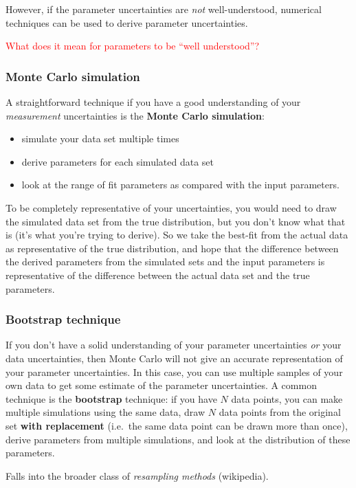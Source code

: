 \documentclass{article}
\newcommand{\mynotes}[1]{%
    \textcolor{myGreen}{#1}
    }
\begin{document}
However, if the parameter uncertainties are \emph{not} well-understood,
numerical techniques can be used to derive parameter uncertainties.

\textcolor{red}{What does it mean for parameters to be ``well understood''?}

\subsubsection{Monte Carlo simulation}
A straightforward technique if you have a good understanding of your
\emph{measurement} uncertainties is the \textbf{Monte Carlo simulation}:
\begin{itemize}
    \item simulate your data set multiple times
    \item derive parameters for each simulated data set
    \item look at the range of fit parameters as compared with
        the input parameters.
\end{itemize}
To be completely representative of your uncertainties, you would need to draw
the simulated data set from the true distribution, but you don't know what that
is (it's what you're trying to derive). So we take the best-fit from the actual
data as representative of the true distribution, and hope that the difference
between the derived parameters from the simulated sets and the input parameters
is representative of the difference between the actual data set and the true
parameters.

\subsubsection{Bootstrap technique}
If you don't have a solid understanding of your parameter uncertainties
\emph{or} your data uncertainties, then Monte Carlo will not give an accurate
representation of your parameter uncertainties. In this case, you can use
multiple samples of your own data to get some estimate of the parameter
uncertainties. A common technique is the \textbf{bootstrap} technique: if you
have $N$ data points, you can make multiple simulations using the same data,
draw $N$ data points from the original set \textbf{with replacement} (i.e.\ the
same data point can be drawn more than once), derive parameters from multiple
simulations, and look at the distribution of these parameters.

\mynotes{Falls into the broader class of \textit{resampling methods}
    (wikipedia).}
\end{document}

